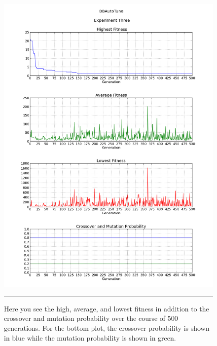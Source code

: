 \begin{figure}[htbp]
\centering
\includegraphics[width=5in]{../Figures/Chapter4/exp3_halcm.png}
\rule{35em}{0.5pt}
\caption[Experiment Three GA Metrics]{Here you see the high, average, and lowest fitness in addition to the crossover and mutation probability over the course of 500 generations. For the bottom plot, the crossover probability is shown in blue while the mutation probability is shown in green.}
\label{fig:exp3_halcm}
\end{figure}

